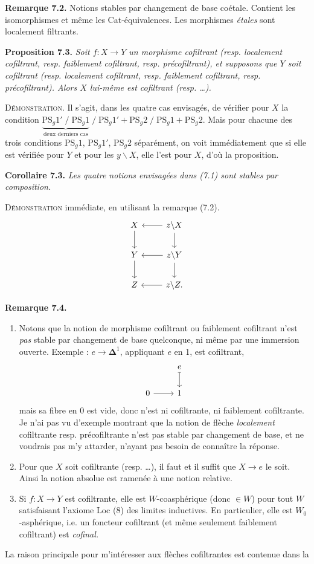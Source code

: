 \textbf{Remarque 7.2.} Notions stables par changement de base coétale. Contient les isomorphismes et même les Cat-équivalences. Les morphismes \textit{étales} sont localement filtrants.

\textbf{Proposition 7.3.} \textit{Soit $f : X \longrightarrow Y$ un morphisme cofiltrant (resp. localement cofiltrant, resp. faiblement cofiltrant, resp. précofiltrant), et supposons que $Y$ soit cofiltrant (resp. localement cofiltrant, resp. faiblement cofiltrant, resp. précofiltrant). Alors $X$ lui-même est cofiltrant (resp. \dots).}

\textsc{Démonstration}. Il s'agit, dans les quatre cas envisagés, de vérifier pour $X$ la condition $\underbrace{\mathrm{PS}_g1' \;/\; \mathrm{PS}_g1}_{\text{deux derniers cas}} \;/\; \mathrm{PS}_g1' + \mathrm{PS}_g2 \;/\; \mathrm{PS}_g1 + \mathrm{PS}_g2$. Mais  pour chacune des trois conditions $\mathrm{PS}_g1$, $\mathrm{PS}_g1'$, $\mathrm{PS}_g2$ séparément, on voit immédiatement que si elle est vérifiée pour $Y$ et pour les $y\backslash X$, elle l'est pour $X$, d'où la proposition.

\textbf{Corollaire 7.3.} \textit{Les quatre notions envisagées dans (7.1) sont stables par composition.}

\textsc{Démonstration} immédiate, en utilisant la remarque (7.2).
\[
\begin{tikzcd}
X \arrow[d] & z\backslash X \arrow[l] \arrow[d] \\
Y \arrow[d] & z\backslash Y \arrow[l] \arrow[d] \\
Z & z\backslash Z. \arrow[l]
\end{tikzcd}
\]

\textbf{Remarque 7.4.}
\begin{enumerate}
\item[1)] Notons que la notion de morphisme cofiltrant ou faiblement cofiltrant n'est \textit{pas} stable par changement de base quelconque, ni même par une immersion ouverte. Exemple : $e \longrightarrow \boldsymbol{\Delta}^1$, appliquant $e$ en 1, est cofiltrant,
\[
\begin{tikzcd}
 & e \arrow[d, mapsto] \\
0 \arrow[r] & 1
\end{tikzcd}
\]
mais sa fibre en 0 est vide, donc n'est ni cofiltrante, ni faiblement cofiltrante. Je n'ai pas vu d'exemple montrant que la notion de flèche \textit{localement} cofiltrante resp. précofiltrante n'est pas stable par changement de base, et ne voudrais pas m'y attarder, n'ayant pas besoin de connaître la réponse.
\item[2)] Pour que $X$ soit cofiltrante (resp. \dots), il faut et il suffit que $X \longrightarrow e$ le soit. Ainsi la notion absolue est ramenée à une notion relative.
\item[3)] Si $f : X \longrightarrow Y$ est cofiltrante, elle est  $W$-coasphérique (donc $\in W$) pour tout $W$ satisfaisant l'axiome Loc (8) des limites inductives. En particulier, elle est $W_0$-asphérique, i.e. un foncteur cofiltrant (et même seulement faiblement cofiltrant) est \textit{cofinal.}
\end{enumerate}
La raison principale pour m'intéresser aux flèches cofiltrantes est contenue dans la


